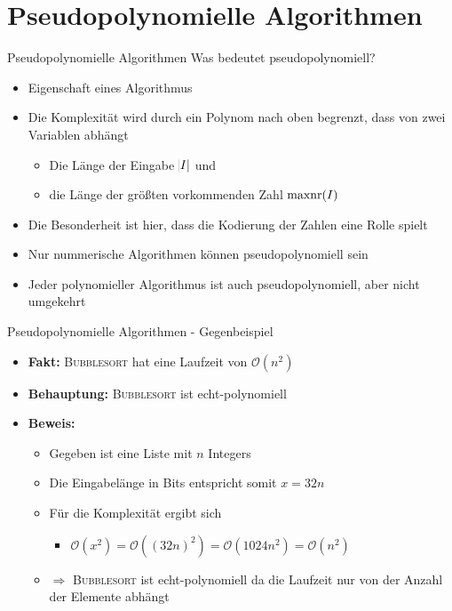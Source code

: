 \section{Pseudopolynomielle Algorithmen}

\begin{frame}{Pseudopolynomielle Algorithmen}
Was bedeutet pseudopolynomiell?

\begin{itemize}
   	\item Eigenschaft eines Algorithmus
	\item Die Komplexität wird durch ein Polynom nach oben begrenzt, dass von zwei Variablen abhängt
    \begin{itemize}
        \item Die Länge der Eingabe $\abs{I}$ und
        \item die Länge der größten vorkommenden Zahl $\operatorname{maxnr}(I)$
    \end{itemize}
    \item Die Besonderheit ist hier, dass die Kodierung der Zahlen eine Rolle spielt
    \item Nur nummerische Algorithmen können pseudopolynomiell sein
    \item Jeder polynomieller Algorithmus ist auch pseudopolynomiell, aber nicht umgekehrt
\end{itemize}
\end{frame}

\begin{frame}{Pseudopolynomielle Algorithmen - Gegenbeispiel}
    \begin{itemize}
        \item \textbf{Fakt:} \textsc{Bubblesort} hat eine Laufzeit von $\mathcal{O}(n^2)$
        \item \textbf{Behauptung:} \textsc{Bubblesort} ist echt-polynomiell
        \item \textbf{Beweis:}
        \begin{itemize}
            \item Gegeben ist eine Liste mit $n$ Integers
            \item Die Eingabelänge in Bits entspricht somit $x=32n$
            \item Für die Komplexität ergibt sich
            \begin{itemize}
                \item $\mathcal{O}(x^2)=\mathcal{O}((32n)^2)=\mathcal{O}(1024n^2)=\mathcal{O}(n^2)$      
            \end{itemize}
            \item[] $\Rightarrow$ \textsc{Bubblesort} ist echt-polynomiell da die Laufzeit nur von der Anzahl der Elemente abhängt
        \end{itemize}
    \end{itemize}
\end{frame}

